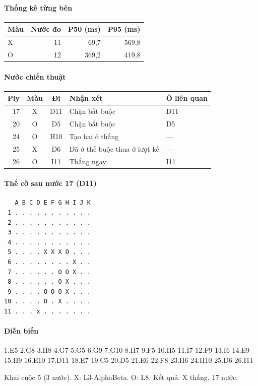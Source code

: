 \paragraph{Thống kê từng bên}
\begin{center}\small
\begin{tabular}{@{}lrrr@{}}
\toprule
Màu & Nước đo & P50 (ms) & P95 (ms) \\
\midrule
X & 11 & 69,7 & 569,8 \\
O & 12 & 369,2 & 419,8 \\
\bottomrule
\end{tabular}
\end{center}
\paragraph{Nước chiến thuật}
\begin{center}\small
\begin{tabular}{@{}rccll@{}}
\toprule
Ply & Màu & Đi & Nhận xét & Ô liên quan \\
\midrule
17 & X & D11 & Chặn bắt buộc & D11 \\
20 & O & D5 & Chặn bắt buộc & D5 \\
24 & O & H10 & Tạo hai ô thắng & — \\
25 & X & D6 & Đã ở thế buộc thua ở lượt kế & — \\
26 & O & I11 & Thắng ngay & I11 \\
\bottomrule
\end{tabular}
\end{center}
\paragraph{Thế cờ sau nước 17 (D11)}
\begin{verbatim}
   A B C D E F G H I J K
 1 . . . . . . . . . . .
 2 . . . . . . . . . . .
 3 . . . . . . . . . . .
 4 . . . . . . . . . . .
 5 . . . . X X X O . . .
 6 . . . . . . . . X . .
 7 . . . . . . O O X . .
 8 . . . . . . O X . . .
 9 . . . . O O O X . . .
10 . . . . O . X . . . .
11 . . . x . . . . . . .
\end{verbatim}
\paragraph{Diễn biến}
{\footnotesize 1.E5 2.G8 3.H8 4.G7 5.G5 6.G9 7.G10 8.H7 9.F5 10.H5 11.I7 12.F9 13.I6 14.E9 15.H9 16.E10 17.D11 18.E7 19.C5 20.D5 21.E6 22.F8 23.H6 24.H10 25.D6 26.I11\par}
Khai cuộc 5 (3 nước). X: L3-AlphaBeta. O: L8. Kết quả: X thắng, 17 nước.
